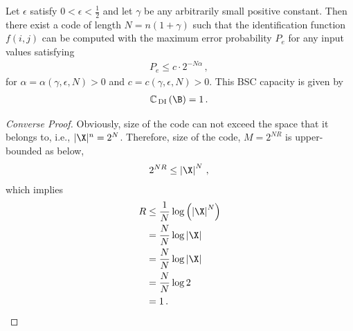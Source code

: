 \begin{theorem}
\label{theorem.IDproblem}
Let $\epsilon$ satisfy $0<\epsilon<\frac{1}{2}$ and let $\gamma$ be any arbitrarily small positive constant. Then there exist a code of length $N=n(1+\gamma)$ such that the identification function $f(i,j)$ can be computed with the maximum error probability $P_e$ for any input values satisfying
%
\begin{align*}
    P_e \leq c\cdot2^{-N\alpha} \, , \,
\end{align*}
%
for $\alpha = \alpha(\gamma,\epsilon,N)>0$ and $c = c(\gamma,\epsilon,N)>0$.
This BSC capacity is given by 
\begin{align}
    \label{Th.DI}
    \mathbb{C}_{\,\text{DI}} \left( \B \right) = 1 \,.\,
\end{align}
\end{theorem}
\begin{proof}[Converse Proof]
\label{Sec.Converse}
Obviously, size of the code can not exceed the space that it belongs to, i.e., $|\X|^n = 2^N$. Therefore, size of the code, $M = 2^{NR}$ is upper-bounded as below,
\begin{align}
     2^{NR} \leq \left| \X \right|^N \,,\,
\end{align}
which implies
\begin{align}
\label{upperbound.Rate}
    R & \leq \frac{1}{N} \log\left( \left| \X \right|^N \right)
    \nonumber\\
    & = \frac{N}{N} \log \left| \X \right|
    \nonumber\\
    & = \frac{N}{N} \log \left| \X \right|
    \nonumber\\
    & = \frac{N}{N} \log 2 
    \nonumber\\
    & = 1 \,.\,
\end{align}
\end{proof}
